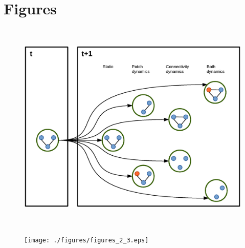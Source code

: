 \documentclass[12pt]{article}
\begin{document}
\newpage


\section*{Figures}


\begin{figure}[hb!]
\hspace{0.75 in}\includegraphics[height=4in,width=5in]{./figures/Figure2.eps}
\caption{}
\label{fig:Figure1}
\end{figure}

\begin{figure}[hb!]
\begin{center}
\texttt{[image: ./figures/figures\_2\_3.eps]}
\end{center}
\caption{}
\label{fig:Figure2_3}
\end{figure}

\end{document}
